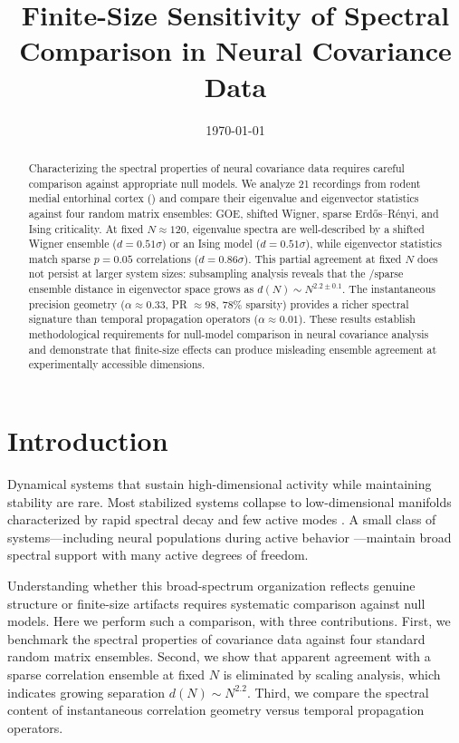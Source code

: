 \documentclass[aps,prf,reprint,twocolumn]{revtex4-2}
\newcommand{\mec}{\text{MEC}}
\begin{document}
\title{Finite-Size Sensitivity of Spectral Comparison in Neural Covariance Data}

\author{}

\date{\today}

\begin{abstract}
Characterizing the spectral properties of neural covariance data requires careful comparison against appropriate null models. We analyze 21 recordings from rodent medial entorhinal cortex (\mec) and compare their eigenvalue and eigenvector statistics against four random matrix ensembles: GOE, shifted Wigner, sparse Erd\H{o}s--R\'{e}nyi, and Ising criticality. At fixed $N \approx 120$, \mec{} eigenvalue spectra are well-described by a shifted Wigner ensemble ($d = 0.51\sigma$) or an Ising model ($d = 0.51\sigma$), while eigenvector statistics match sparse $p=0.05$ correlations ($d = 0.86\sigma$). This partial agreement at fixed $N$ does not persist at larger system sizes: subsampling analysis reveals that the \mec/sparse ensemble distance in eigenvector space grows as $d(N) \sim N^{2.2 \pm 0.1}$. The instantaneous precision geometry ($\alpha \approx 0.33$, PR $\approx 98$, $78\%$ sparsity) provides a richer spectral signature than temporal propagation operators ($\alpha \approx 0.01$). These results establish methodological requirements for null-model comparison in neural covariance analysis and demonstrate that finite-size effects can produce misleading ensemble agreement at experimentally accessible dimensions.
\end{abstract}

\maketitle

\section{Introduction}

Dynamical systems that sustain high-dimensional activity while maintaining stability are rare. Most stabilized systems collapse to low-dimensional manifolds characterized by rapid spectral decay and few active modes \cite{ganguli2012,pennington2017}. A small class of systems---including neural populations during active behavior \cite{mazor2005,churchland2012,stringer2019}---maintain broad spectral support with many active degrees of freedom.

Understanding whether this broad-spectrum organization reflects genuine structure or finite-size artifacts requires systematic comparison against null models. Here we perform such a comparison, with three contributions. First, we benchmark the spectral properties of \mec{} covariance data against four standard random matrix ensembles. Second, we show that apparent agreement with a sparse correlation ensemble at fixed $N$ is eliminated by scaling analysis, which indicates growing separation $d(N) \sim N^{2.2}$. Third, we compare the spectral content of instantaneous correlation geometry versus temporal propagation operators.
\end{document}
